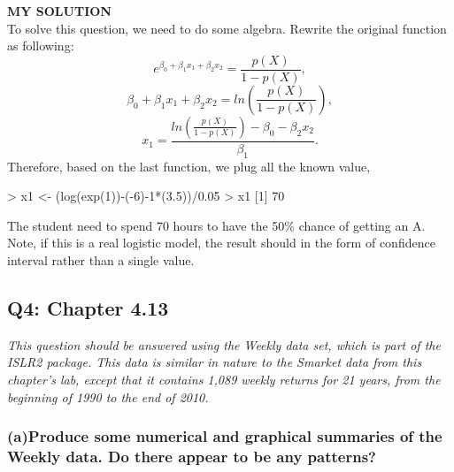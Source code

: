 \documentclass[
]{article}
\newenvironment{Shaded}{\begin{snugshade}}{\end{snugshade}}
\newcommand{\DecValTok}[1]{\textcolor[rgb]{0.00,0.00,0.81}{#1}}
\newcommand{\FloatTok}[1]{\textcolor[rgb]{0.00,0.00,0.81}{#1}}
\newcommand{\FunctionTok}[1]{\textcolor[rgb]{0.00,0.00,0.00}{#1}}
\newcommand{\NormalTok}[1]{#1}
\newcommand{\OtherTok}[1]{\textcolor[rgb]{0.56,0.35,0.01}{#1}}
\newcommand{\SpecialCharTok}[1]{\textcolor[rgb]{0.00,0.00,0.00}{#1}}
\begin{document}
\textbf{MY SOLUTION}\\
To solve this question, we need to do some algebra. Rewrite the original
function as following:
\[e^{\beta_0 + \beta_1x_1 + \beta_2x_2} = \frac{p(X)}{1-p(X)},\]
\[\beta_0 + \beta_1x_1 + \beta_2x_2 = ln(\frac{p(X)}{1-p(X)}),\]
\[x_1 =\frac{ln(\frac{p(X)}{1-p(X)})-\beta_0 - \beta_2x_2}{\beta_1}.\]
Therefore, based on the last function, we plug all the known value,

\begin{Shaded}
\begin{Highlighting}[]
\SpecialCharTok{\textgreater{}}\NormalTok{ x1 }\OtherTok{\textless{}{-}}\NormalTok{ (}\FunctionTok{log}\NormalTok{(}\FunctionTok{exp}\NormalTok{(}\DecValTok{1}\NormalTok{))}\SpecialCharTok{{-}}\NormalTok{(}\SpecialCharTok{{-}}\DecValTok{6}\NormalTok{)}\SpecialCharTok{{-}}\DecValTok{1}\SpecialCharTok{*}\NormalTok{(}\FloatTok{3.5}\NormalTok{))}\SpecialCharTok{/}\FloatTok{0.05}
\SpecialCharTok{\textgreater{}}\NormalTok{ x1}
\NormalTok{[}\DecValTok{1}\NormalTok{] }\DecValTok{70}
\end{Highlighting}
\end{Shaded}

The student need to spend 70 hours to have the 50\% chance of getting an
A. Note, if this is a real logistic model, the result should in the form
of confidence interval rather than a single value.

\hypertarget{q4-chapter-4.13}{%
\subsection{Q4: Chapter 4.13}\label{q4-chapter-4.13}}

\emph{This question should be answered using the Weekly data set, which
is part of the ISLR2 package. This data is similar in nature to the
Smarket data from this chapter's lab, except that it contains 1,089
weekly returns for 21 years, from the beginning of 1990 to the end of
2010.}

\hypertarget{aproduce-some-numerical-and-graphical-summaries-of-the-weekly-data.-do-there-appear-to-be-any-patterns}{%
\subsubsection{\texorpdfstring{\textbf{(a)Produce some numerical and
graphical summaries of the Weekly data. Do there appear to be any
patterns?}}{(a)Produce some numerical and graphical summaries of the Weekly data. Do there appear to be any patterns?}}\label{aproduce-some-numerical-and-graphical-summaries-of-the-weekly-data.-do-there-appear-to-be-any-patterns}}
\end{document}
